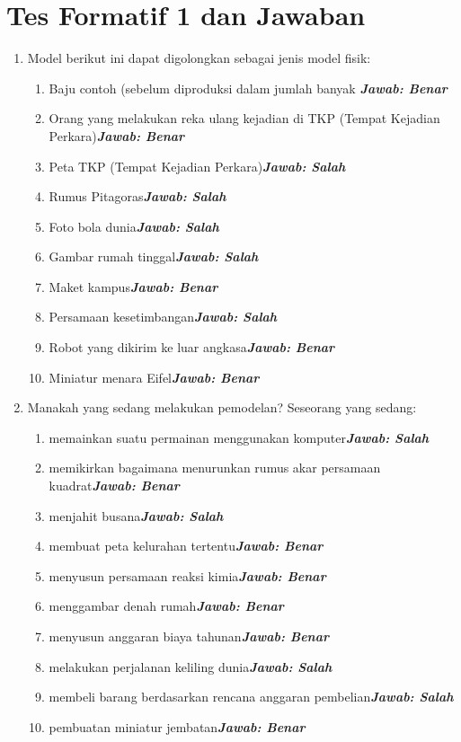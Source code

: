 \documentclass[10pt]{article}
\begin{document}
\section{Tes Formatif 1 dan Jawaban}
\begin{enumerate}
    \item Model berikut ini dapat digolongkan sebagai jenis model fisik:
    \begin{enumerate}
        \item Baju contoh (sebelum diproduksi dalam jumlah banyak \textbf{\emph{Jawab: Benar}} 
        \item Orang yang melakukan reka ulang kejadian di TKP (Tempat
        Kejadian Perkara)\textbf{\emph{Jawab: Benar}}
        \item Peta TKP (Tempat Kejadian Perkara)\textbf{\emph{Jawab: Salah}}
        \item Rumus Pitagoras\textbf{\emph{Jawab: Salah}}
        \item Foto bola dunia\textbf{\emph{Jawab: Salah}}
        \item Gambar rumah tinggal\textbf{\emph{Jawab: Salah}}
        \item Maket kampus\textbf{\emph{Jawab: Benar}}
        \item Persamaan kesetimbangan\textbf{\emph{Jawab: Salah}}
        \item Robot yang dikirim ke luar angkasa\textbf{\emph{Jawab: Benar}}
        \item Miniatur menara Eifel\textbf{\emph{Jawab: Benar}}
    \end{enumerate} 
\item Manakah yang sedang melakukan pemodelan?
Seseorang yang sedang: 
\begin{enumerate}
    \item memainkan suatu permainan menggunakan komputer\textbf{\emph{Jawab: Salah}}
    \item memikirkan bagaimana menurunkan rumus akar persamaan kuadrat\textbf{\emph{Jawab: Benar}}
\item menjahit busana\textbf{\emph{Jawab: Salah}}
\item membuat peta kelurahan tertentu\textbf{\emph{Jawab: Benar}}
\item menyusun persamaan reaksi kimia\textbf{\emph{Jawab: Benar}}
\item menggambar denah rumah\textbf{\emph{Jawab: Benar}}
\item menyusun anggaran biaya tahunan\textbf{\emph{Jawab: Benar}}
\item melakukan perjalanan keliling dunia\textbf{\emph{Jawab: Salah}}
\item membeli barang berdasarkan rencana anggaran pembelian\textbf{\emph{Jawab: Salah}}
\item pembuatan miniatur jembatan\textbf{\emph{Jawab: Benar}}

\end{enumerate}\end{enumerate}
\end{document}
